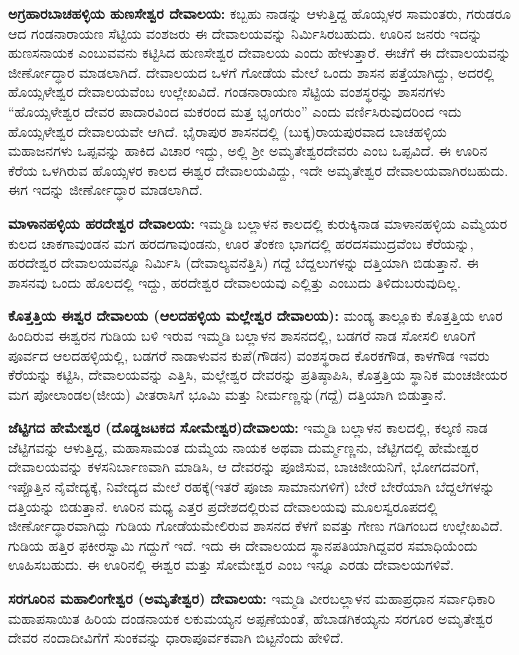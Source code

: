 \textbf{ಅಗ್ರಹಾರಬಾಚಹಳ್ಳಿಯ ಹುಣಸೇಶ್ವರ ದೇವಾಲಯ:} ಕಬ್ಬಹು ನಾಡನ್ನು ಆಳುತ್ತಿದ್ದ ಹೊಯ್ಸಳರ ಸಾಮಂತರು, ಗರುಡರೂ ಆದ ಗಂಡನಾರಾಯಣ ಸೆಟ್ಟಿಯ ವಂಶಜರು ಈ ದೇವಾಲಯವನ್ನು ನಿರ್ಮಿಸಿರಬಹುದು. ಊರಿನ ಜನರು ಇದನ್ನು ಹುಣಸನಾಯಕ ಎಂಬುವವನು ಕಟ್ಟಿಸಿದ ಹುಣಸೇಶ್ವರ ದೇವಾಲಯ ಎಂದು ಹೇಳುತ್ತಾರೆ. ಈಚೆಗೆ ಈ ದೇವಾಲಯವನ್ನು ಜೀರ್ಣೋದ್ಧಾರ ಮಾಡಲಾಗಿದೆ. ದೇವಾಲಯದ ಒಳಗೆ ಗೋಡೆಯ ಮೇಲೆ ಒಂದು ಶಾಸನ ಪತ್ತೆಯಾಗಿದ್ದು, ಅದರಲ್ಲಿ ಹೊಯ್ಸಳೇಶ್ವರ ದೇವಾಲಯವೆಂಬ ಉಲ್ಲೇಖವಿದೆ. ಗಂಡನಾರಾಯಣ ಸೆಟ್ಟಿಯ ವಂಶಸ್ಥರನ್ನು ಶಾಸನಗಳು “ಹೊಯ್ಸಳೇಶ್ವರ ದೇವರ ಪಾದಾರವಿಂದ ಮಕರಂದ ಮತ್ತ ಭೃಂಗರುಂ” ಎಂದು ವರ್ಣಿಸಿರುವುದರಿಂದ ಇದು ಹೊಯ್ಸಳೇಶ್ವರ ದೇವಾಲಯವೇ ಆಗಿದೆ. ಭೈರಾಪುರ ಶಾಸನದಲ್ಲಿ (ಬುಕ್ಕ)ರಾಯಪುರವಾದ ಬಾಚಹಳ್ಳಿಯ ಮಹಾಜನಗಳು ಒಪ್ಪವನ್ನು ಹಾಕಿದ ವಿಚಾರ ಇದ್ದು, ಅಲ್ಲಿ ಶ‍್ರೀ ಅಮೃತೇಶ್ವರದೇವರು ಎಂಬ ಒಪ್ಪವಿದೆ. ಈ ಊರಿನ ಕೆರೆಯ ಒಳಗಿರುವ ಹೊಯ್ಸಳರ ಕಾಲದ ಈಶ್ವರ ದೇವಾಲಯವಿದ್ದು, ಇದೇ ಅಮೃತೇಶ್ವರ ದೇವಾಲಯವಾಗಿರಬಹುದು. ಈಗ ಇದನ್ನು ಜೀರ್ಣೋದ್ಧಾರ ಮಾಡಲಾಗಿದೆ. 

\textbf{ಮಾಳಾನಹಳ್ಳಿಯ ಹರದೇಶ್ವರ ದೇವಾಲಯ:} ಇಮ್ಮಡಿ ಬಲ್ಲಾಳನ ಕಾಲದಲ್ಲಿ ಕುರುಕ್ಕಿನಾಡ ಮಾಳಾನಹಳ್ಳಿಯ ಎಮ್ಮೆಯರ ಕುಲದ ಚಾಕಗಾವುಂಡನ ಮಗ ಹರದಗಾವುಂಡನು, ಊರ ತೆಂಕಣ ಭಾಗದಲ್ಲಿ ಹರದಸಮುದ್ರವೆಂಬ ಕೆರೆಯನ್ನು, ಹರದೇಶ್ವರ ದೇವಾಲಯವನ್ನೂ ನಿರ್ಮಿಸಿ (ದೇವಾಲ್ಯವನೆತ್ತಿಸಿ) ಗದ್ದೆ ಬೆದ್ದಲುಗಳನ್ನು ದತ್ತಿಯಾಗಿ ಬಿಡುತ್ತಾನೆ. ಈ ಶಾಸನವು ಒಂದು ಹೊಲದಲ್ಲಿ ಇದ್ದು, ಹರದೇಶ್ವರ ದೇವಾಲಯವು ಎಲ್ಲಿತ್ತು ಎಂಬುದು ತಿಳಿದುಬರುವುದಿಲ್ಲ.

\textbf{ಕೊತ್ತತ್ತಿಯ ಈಶ್ವರ ದೇವಾಲಯ (ಆಲದಹಳ್ಳಿಯ ಮಲ್ಲೇಶ್ವರ ದೇವಾಲಯ):} ಮಂಡ್ಯ ತಾಲ್ಲೂಕು ಕೊತ್ತತ್ತಿಯ ಊರ ಹಿಂದಿರುವ ಈಶ್ವರನ ಗುಡಿಯ ಬಳಿ ಇರುವ ಇಮ್ಮಡಿ ಬಲ್ಲಾಳನ ಶಾಸನದಲ್ಲಿ, ಬಡಗರೆ ನಾಡ ಸೋಸಲಿ ಊರಿಗೆ ಪೂರ್ವದ ಆಲದಹಳ್ಳಿಯಲ್ಲಿ, ಬಡಗರೆ ನಾಡಾಳುವನ ಕುಪೆ(ಗೌಡನ) ವಂಶಸ್ಥರಾದ ಕೊರಕಗೌಡ, ಕಾಳಗೌಡ ಇವರು ಕೆರೆಯನ್ನು ಕಟ್ಟಿಸಿ, ದೇವಾಲಯವನ್ನು ಎತ್ತಿಸಿ, ಮಲ್ಲೇಶ್ವರ ದೇವರನ್ನು ಪ್ರತಿಷ್ಠಾಪಿಸಿ, ಕೊತ್ತತ್ತಿಯ ಸ್ಥಾನಿಕ ಮಂಚಜೀಯರ ಮಗ ಪೋಲಾಂಡಲ(ಜೀಯ) ವೀತರಾಸಿಗೆ ಭೂಮಿ ಮತ್ತು ನೀರ್ಮಣ್ಣನ್ನು(ಗದ್ದೆ) ದತ್ತಿಯಾಗಿ ಬಿಡುತ್ತಾನೆ.

\textbf{ಜೆಟ್ಟಿಗದ ಹೇಮೇಶ್ವರ (ದೊಡ್ಡಜಟಕದ ಸೋಮೇಶ್ವರ)ದೇವಾಲಯ:} ಇಮ್ಮಡಿ ಬಲ್ಲಾಳನ ಕಾಲದಲ್ಲಿ, ಕಲ್ಕಣಿ ನಾಡ ಜೆಟ್ಟಿಗವನ್ನು ಆಳುತ್ತಿದ್ದ, ಮಹಾಸಾಮಂತ ದುಮ್ಮೆಯ ನಾಯಕ ಅಥವಾ ದುರ್ಮ್ಮಣ್ಣನು, ಜೆಟ್ಟಿಗದಲ್ಲಿ ಹೇಮೇಶ್ವರ ದೇವಾಲಯವನ್ನು ಕಳಸನಿರ್ಬಾಣವಾಗಿ ಮಾಡಿಸಿ, ಆ ದೇವರನ್ನು ಪೂಜಿಸುವ, ಬಾಚಿಜೀಯನಿಗೆ, ಭೋಗದವರಿಗೆ, ಇಪ್ಪೊತ್ತಿನ ನೈವೇದ್ಯಕ್ಕೆ, ನಿವೇದ್ಯದ ಮೇಲೆ ರಹಕ್ಕೆ(ಇತರೆ ಪೂಜಾ ಸಾಮಾನುಗಳಿಗೆ) ಬೇರೆ ಬೇರೆಯಾಗಿ ಬೆದ್ದಲೆಗಳನ್ನು ದತ್ತಿಯನ್ನು ಬಿಡುತ್ತಾನೆ. ಊರಿನ ಮಧ್ಯ ಎತ್ತರ ಪ್ರದೇಶದಲ್ಲಿರುವ ದೇವಾಲಯವು ಮೂಲಸ್ವರೂಪದಲ್ಲಿ ಜೀರ್ಣೋದ್ಧಾರವಾಗಿದ್ದು ಗುಡಿಯ ಗೋಡೆಯಮೇಲಿರುವ ಶಾಸನದ ಕೆಳಗೆ ಐವತ್ತು ಗೇಣು ಗಡಿಗಂಬದ ಉಲ್ಲೇಖವಿದೆ. ಗುಡಿಯ ಹತ್ತಿರ ಫಕೀರಸ್ವಾಮಿ ಗದ್ದುಗೆ ಇದೆ. ಇದು ಈ ದೇವಾಲಯದ ಸ್ಥಾನಪತಿಯಾಗಿದ್ದವರ ಸಮಾಧಿಯೆಂದು ಊಹಿಸಬಹುದು. ಈ ಊರಿನಲ್ಲಿ ಈಶ್ವರ ಮತ್ತು ಸೋಮೇಶ್ವರ ಎಂಬ ಇನ್ನೂ ಎರಡು ದೇವಾಲಯಗಳಿವೆ.

\textbf{ಸರಗೂರಿನ ಮಹಾಲಿಂಗೇಶ್ವರ (ಅಮೃತೇಶ್ವರ) ದೇವಾಲಯ:} ಇಮ್ಮಡಿ ವೀರಬಲ್ಲಾಳನ ಮಹಾಪ್ರಧಾನ ಸರ್ವಾಧಿಕಾರಿ ಮಹಾಪಸಾಯಿತ ಹಿರಿಯ ದಂಡನಾಯಕ ಲಕುಮಯ್ಯನ ಅಪ್ಪಣೆಯಂತೆ, ಹೆಬಾಡಗಿಕಯ್ಯನು ಸರಗೂರ ಅಮೃತೇಶ್ವರ ದೇವರ ನಂದಾದೀವಿಗೆಗೆ ಸುಂಕವನ್ನು ಧಾರಾಪೂರ್ವಕವಾಗಿ ಬಿಟ್ಟನೆಂದು ಹೇಳಿದೆ.

